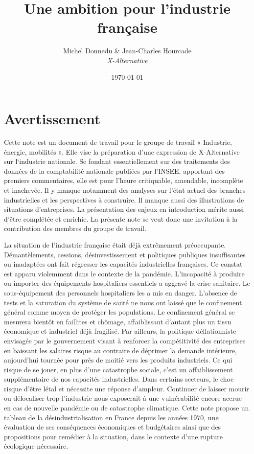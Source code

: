 \documentclass[a4paper]{article}
\author{Michel Donnedu \& Jean-Charles Hourcade\\
\large \textit{X-Alternative}}
\date{\today}
\title{Une ambition pour l'industrie française}
\begin{document}
\maketitle
\newpage
\tableofcontents
\newpage
\section{Avertissement}
Cette note est un document de travail pour le groupe de travail « Industrie, énergie, mobilités ». Elle vise la préparation d’une expression de X-Alternative sur l‘industrie nationale. Se fondant essentiellement sur des traitements des données de la comptabilité nationale publiées par l’INSEE, apportant des premiers commentaires, elle est pour l’heure critiquable, amendable, incomplète et inachevée. Il y manque notamment des analyses sur l’état actuel des branches industrielles et  les perspectives à construire. Il manque aussi des illustrations de situations d’entreprises. La présentation des enjeux en introduction mérite aussi d’être complétée et enrichie. La présente note se veut donc une invitation à la contribution des membres du groupe de travail. 
\newpage

La situation de l’industrie française était déjà extrêmement préoccupante. Démantèlements, cessions, désinvestissement et politiques publiques insuffisantes ou inadaptées ont fait régresser les capacités industrielles françaises. 
Ce constat est apparu violemment dans le contexte de la pandémie. L’incapacité à produire ou importer des équipements hospitaliers essentiels a aggravé la crise sanitaire. Le sous-équipement des personnels hospitaliers les a mis en danger. L’absence de tests et la saturation du système de santé ne nous ont laissé que le confinement général comme moyen de protéger les populations. 
Le confinement général se mesurera bientôt en faillites et chômage, affaiblissant d’autant plus un tissu économique et industriel déjà fragilisé. Par ailleurs, la politique déflationniste envisagée par le gouvernement visant à renforcer la compétitivité des entreprises en baissant les salaires risque au contraire de déprimer la demande intérieure, aujourd’hui tournée pour près de moitié vers les produits industriels. 
Ce qui risque de se jouer, en plus d’une catastrophe sociale, c’est un affaiblissement supplémentaire de nos capacités industrielles. Dans certains secteurs, le choc risque d’être létal et nécessite une réponse d’ampleur. Continuer de laisser mourir ou délocaliser trop l’industrie nous exposerait à une vulnérabilité encore accrue en cas de nouvelle pandémie ou de catastrophe climatique. 
Cette note propose un tableau de la désindustrialisation en France depuis les années 1970, une évaluation de ses conséquences économiques et budgétaires ainsi que des propositions pour remédier à la situation, dans le contexte d’une rupture écologique nécessaire. 
\end{document}

